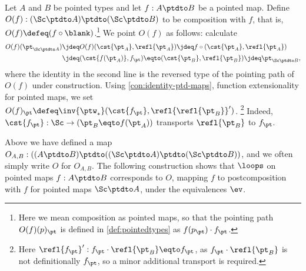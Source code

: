 \begin{definition}\label{def:O-mega}
Let $A$ and $B$ be pointed types and 
let $f: A\ptdto B$ be a pointed map.
Define $O(f):(\Sc\ptdto A)\ptdto(\Sc\ptdto B)$ to be composition with $f$,
that is, $O(f)\defeq (f\circ\blank)$.\footnote{%
Here we mean composition as pointed maps,
so that the pointing path $O(f)(p)_\pt$ is defined in 
\cref{def:pointedtypes} as $f(p_\pt)\cdot f_\pt$.}
We point $O(f)$ as follows: calculate 
\begin{align*}
  O(f)(\pt_{\Sc\ptdto A})
  &\jdeq O(f)(\cst{\pt_A},\refl{\pt_A})
   \jdeq f\circ (\cst{\pt_A},\refl{\pt_A})
\\
  &\jdeq (\cst{f(\pt_A)},f_\pt)
  \eqto (\cst{\pt_B},\refl{\pt_B})
   \jdeq\pt_{\Sc\ptdto B},
\end{align*}
where the identity in the second line is the reversed type of 
the pointing path of $O(f)$ under construction.
Using \cref{con:identity-ptd-maps}, function extensionality for pointed maps,
we set $O(f)_\pt\defeq\inv{\ptw_*}(\cst{f_\pt},\refl{\refl{\pt_B}}')$.%
\footnote{Here $\refl{f_\pt}' : 
f_\pt \cdot \refl{\pt_B} \eqto f_\pt$, 
as $f_\pt \cdot \refl{\pt_B}$ is not definitionally $f_\pt$,
so a minor additional transport is required.}
Indeed, $\cst{f_\pt} : \Sc\to(\pt_B \eqto f(\pt_A))$ 
transports $\refl{\pt_B}$ to $f_\pt$.
\end{definition}
Above we have defined a 
map $O_{A,B}: ((A\ptdto B)\ptdto((\Sc\ptdto A)\ptdto(\Sc\ptdto B))$,
and we often simply write $O$ for $O_{A,B}$.
The following construction shows that $\loops$ on pointed maps
$f:A\ptdto B$ corresponds to $O$, mapping $f$ to postcomposition with $f$
for pointed maps $\Sc\ptdto A$, under the equivalences $\ev$.

